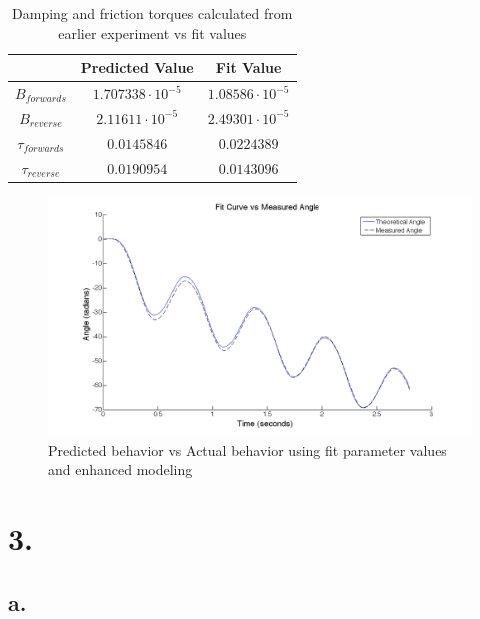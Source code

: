 \documentclass{article}
\theoremstyle{plain}
\theoremstyle{definition}
\theoremstyle{remark}
\begin{document}
\begin{table}[htb]
\begin{center}
    \begin{tabular}{|c|c|c|}
        \hline
        ~                 & Predicted Value          & Fit Value               \\ \hline
        $B_{forwards}$    & $1.707338 \cdot 10^{-5}$ & $1.08586 \cdot 10^{-5}$ \\ 
        $B_{reverse}$     & $2.11611 \cdot 10^{-5}$  & $2.49301 \cdot 10^{-5}$ \\ 
        $\tau_{forwards}$ & $0.0145846$              & $0.0224389$             \\ 
        $\tau_{reverse}$  & $0.0190954$              & $0.0143096$             \\
        \hline
    \end{tabular}
\caption{Damping and friction torques calculated from earlier experiment vs fit values}
\label{q2_b9}
\end{center}
\end{table}

\begin{figure}[htb]
\begin{center}
\includegraphics[width = 14cm]{awesomefitFiner.png}
\caption{Predicted behavior vs Actual behavior using fit parameter values and enhanced modeling}
\label{q2_b3}
\end{center}
\end{figure}

\clearpage

\section*{3.}
\subsection*{a.}
\end{document}
